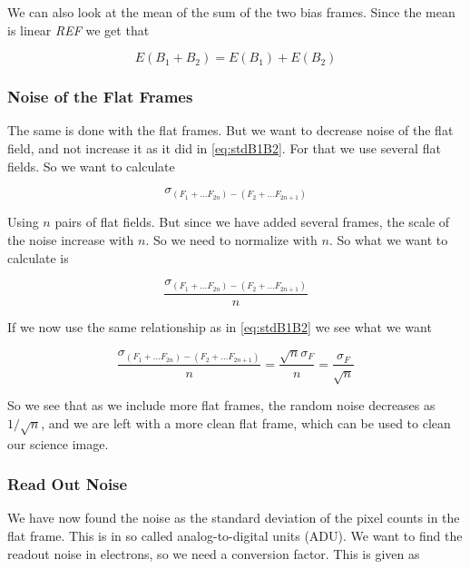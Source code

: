 \documentclass{emulateapj}
\begin{document}
We can also look at the mean of the sum of the two bias frames. Since the mean is linear \emph{REF} we get that

\begin{equation}
E(B_1 + B_2) = E(B_1) + E(B_2)
\label{eq:meanB}
\end{equation}

\subsubsection{Noise of the Flat Frames}
\label{sec:noiseFlat}
The same is done with the flat frames. But we want to decrease noise of the flat field, and not increase it as it did in \eqref{eq:stdB1B2}. For that we use several flat fields. So we want to calculate

\begin{equation}
\sigma_{(F_1 + \ldots F_{2n})- (F_2 + \ldots F_{2n+1})}
\end{equation}

Using $n$ pairs of flat fields. But since we have added several frames, the scale of the noise increase with $n$. So we need to normalize with $n$. So what we want to calculate is

\begin{equation}
\frac{\sigma_{(F_1 + \ldots F_{2n})- (F_2 + \ldots F_{2n+1})}}{n}
\end{equation}

If we now use the same relationship as in \eqref{eq:stdB1B2} we see what we want

\begin{equation}
\frac{\sigma_{(F_1 + \ldots F_{2n})- (F_2 + \ldots F_{2n+1})}}{n} = \frac{\sqrt{n}\sigma_F}{n} = \frac{\sigma_F}{\sqrt{n}}
\end{equation}

So we see that as we include more flat frames, the random noise decreases as $1/\sqrt{n}$, and we are left with a more clean flat frame, which can be used to clean our science image.

\subsubsection{Read Out Noise}

We have now found the noise as the standard deviation of the pixel counts in the flat frame. This is in so called analog-to-digital units (ADU). We want to find the readout noise in electrons, so we need a conversion factor. This is given as
\end{document}
